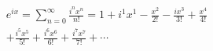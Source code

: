 \documentclass[preview]{standalone}
\begin{document}
\begin{align*}
e^{ix} = \sum_{n=0}^{\infty} \frac{i^nx^n}{n!} = 1 + i^1x^1 - \frac{x^2}{2!} - \frac{ix^3}{3!} + \frac{x^4}{4!} \\ + \frac{i^5x^5}{5!}+ \frac{i^6x^6}{6!} + \frac{i^7x^7}{7!} + \cdots
\end{align*}
\end{document}
